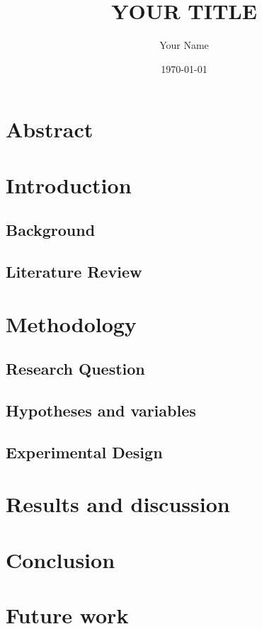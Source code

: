 \documentclass[12pt]{article}
\title{YOUR TITLE}
\author{Your Name}
\date{\today}
\begin{document}
\maketitle
\section*{Abstract}
\section{Introduction}
\subsection{Background}

\subsection{Literature Review}


\section{Methodology}
\subsection{Research Question}

\subsection{Hypotheses and variables}

\subsection{Experimental Design}
\section{Results and discussion}
\section{Conclusion}
\section{Future work}







\end{document}
